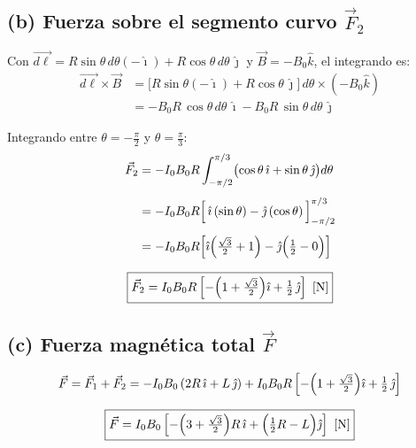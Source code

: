 \documentclass[12pt,letterpaper]{article}
\begin{document}
\bigskip

\subsection*{(b) Fuerza sobre el segmento curvo $\vec{F}_2$}

Con $\vec{d\ell}=R\sin\theta\,d\theta(-\hat{\imath})+R\cos\theta\,d\theta\,\hat{\jmath}$
y $\vec{B}=-B_0\hat{k}$, el integrando es:
\begin{align*}
    \vec{d\ell}\times\vec{B}
      &= \bigl[R\sin\theta(-\hat{\imath})+R\cos\theta\,\hat{\jmath}\bigr]\,d\theta
         \times(-B_0\hat{k}) \\[4pt]
      &= -B_0 R\,\cos\theta\,d\theta\,\hat{\imath}
         - B_0 R\,\sin\theta\,d\theta\,\hat{\jmath}
\end{align*}

Integrando entre $\theta=-\tfrac{\pi}{2}$ y $\theta=\tfrac{\pi}{3}$:
\begin{align*}
    \vec{F}_2 &= -I_0 B_0 R\int_{-\pi/2}^{\pi/3}
                 \bigl(\cos\theta\,\hat{\imath}+\sin\theta\,\hat{\jmath}\bigr)d\theta \\[4pt]
              &= -I_0 B_0 R\Bigl[\,\hat{\imath}\,(\sin\theta)
                 -\hat{\jmath}\,(\cos\theta)\,\Bigr]_{-\pi/2}^{\pi/3} \\[4pt]
              &= -I_0 B_0 R\Bigl[\hat{\imath}\Bigl(\tfrac{\sqrt{3}}{2}+1\Bigr)
                 -\hat{\jmath}\Bigl(\tfrac{1}{2}-0\Bigr)\Bigr]
\end{align*}

\[
    \boxed{\vec{F}_2 = I_0 B_0 R\left[-\Bigl(1+\tfrac{\sqrt{3}}{2}\Bigr)\hat{\imath}
        + \tfrac{1}{2}\,\hat{\jmath}\right]\ [\text{N}]}
\]

\bigskip

\subsection*{(c) Fuerza magn\'etica total $\vec{F}$}

\[
    \vec{F} = \vec{F}_1 + \vec{F}_2
            = -I_0 B_0\,(2R\,\hat{\imath} + L\,\hat{\jmath})
              + I_0 B_0 R\left[-\Bigl(1+\tfrac{\sqrt{3}}{2}\Bigr)\hat{\imath}
              + \tfrac{1}{2}\,\hat{\jmath}\right]
\]

\[
    \boxed{\vec{F} = I_0 B_0\left[-\Bigl(3+\tfrac{\sqrt{3}}{2}\Bigr)R\,\hat{\imath}
        + \Bigl(\tfrac{1}{2}R - L\Bigr)\hat{\jmath}\right]\ [\text{N}]}
\]
\end{document}
